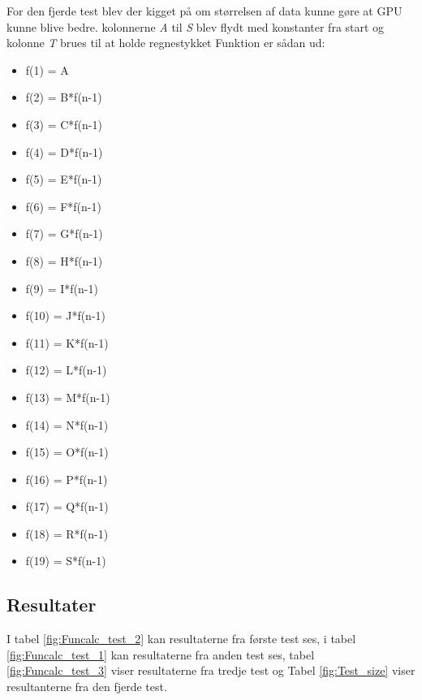 For den fjerde test blev der kigget på om størrelsen af data kunne gøre at GPU kunne blive bedre. kolonnerne \textit{A} til \textit{S} blev flydt med konstanter fra start og kolonne \textit{T} brues til at holde regnestykket Funktion er sådan ud:
\begin{itemize}
\item f(1) = A
\item f(2) = B*f(n-1)
\item f(3) = C*f(n-1)
\item f(4) = D*f(n-1)
\item f(5) = E*f(n-1)
\item f(6) = F*f(n-1)
\item f(7) = G*f(n-1)
\item f(8) = H*f(n-1)
\item f(9) = I*f(n-1)
\item f(10) = J*f(n-1)
\item f(11) = K*f(n-1)
\item f(12) = L*f(n-1)
\item f(13) = M*f(n-1)
\item f(14) = N*f(n-1)
\item f(15) = O*f(n-1)
\item f(16) = P*f(n-1)
\item f(17) = Q*f(n-1)
\item f(18) = R*f(n-1)
\item f(19) = S*f(n-1)
\end{itemize}



\subsection{Resultater}
I tabel \ref{fig:Funcalc_test_2} kan resultaterne fra første test ses, i tabel \ref{fig:Funcalc_test_1} kan resultaterne fra anden test ses, tabel \ref{fig:Funcalc_test_3} viser resultaterne fra tredje test og
Tabel \ref{fig:Test_size} viser resultanterne fra den fjerde test.


